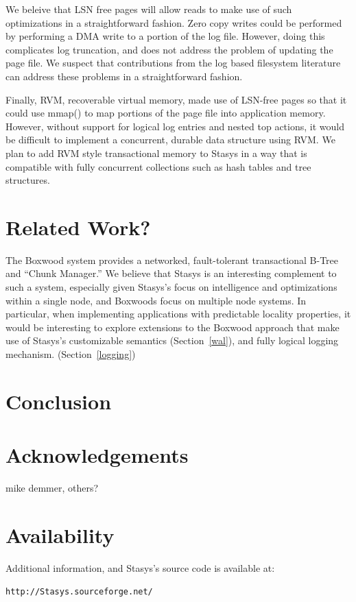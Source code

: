 \documentclass[letterpaper,twocolumn,10pt]{article}
\newcommand{\yad}{Stasys\xspace}
\begin{document}
We beleive that LSN free pages will allow reads to make use of such
optimizations in a straightforward fashion.  Zero copy writes could be
performed by performing a DMA write to a portion of the log file.
However, doing this complicates log truncation, and does not address
the problem of updating the page file.  We suspect that contributions
from the log based filesystem literature can address these problems in
a straightforward fashion.

Finally, RVM, recoverable virtual memory, made use of LSN-free pages
so that it could use mmap() to map portions of the page file into
application memory.  However, without support for logical log entries
and nested top actions, it would be difficult to implement a
concurrent, durable data structure using RVM.  We plan to add RVM
style transactional memory to \yad in a way that is compatible with
fully concurrent collections such as hash tables and tree structures.


\section{Related Work?}

The Boxwood system provides a networked, fault-tolerant transactional
B-Tree and ``Chunk Manager.''  We believe that \yad is an interesting
complement to such a system, especially given \yad's focus on
intelligence and optimizations within a single node, and Boxwoods
focus on multiple node systems.  In particular, when implementing
applications with predictable locality properties, it would be
interesting to explore extensions to the Boxwood approach that make
use of \yad's customizable semantics (Section~\ref{wal}), and fully logical logging
mechanism. (Section~\ref{logging})

\section{Conclusion}

\section{Acknowledgements}

mike demmer, others?

\section{Availability}

Additional information, and \yad's source code is available at:

\begin{center}
{\tt http://\yad.sourceforge.net/}
\end{center}

{\footnotesize 
\nocite{*}
}

\theendnotes
\end{document}
